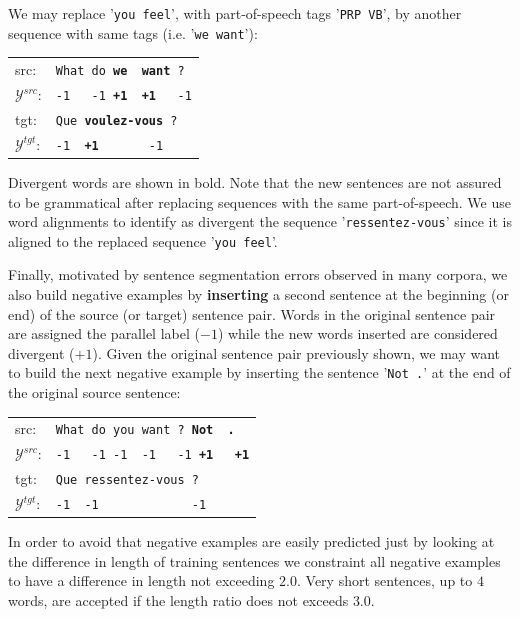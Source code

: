 \documentclass[11pt,a4paper]{article}
\begin{document}
We may replace '\texttt{you feel}', with part-of-speech tags '\texttt{PRP VB}', by another sequence with same tags (i.e. '\texttt{we want}'):

\begin{table}[h]
\begin{tabular}{ll}
src: & { \small \texttt{What do {\bf we \ want} ?}} \\
$\mathcal{Y}^{src}$: & { \small \texttt{-1 \ \  -1 {\bf +1\ \ +1} \ \  -1}} \\
tgt: & { \small \texttt{Que {\bf voulez-vous} ?}} \\
$\mathcal{Y}^{tgt}$: & { \small \texttt{-1\ \ {\bf +1}\ \ \ \ \ \ \ -1}} \\
\end{tabular}
\end{table}

Divergent words are shown in bold. 
Note that the new sentences are not assured to be grammatical after replacing sequences with the same part-of-speech.
We use word alignments to identify as divergent the sequence '\texttt{ressentez-vous}' since it is aligned to the replaced sequence '\texttt{you feel}'.

Finally, motivated by sentence segmentation errors observed in many corpora, we also build negative examples by {\bf inserting} a second sentence at the beginning (or end) of the source (or target) sentence pair. 
Words in the original sentence pair are assigned the parallel label ($-1$) while the new words inserted are considered divergent ($+1$).
Given the original sentence pair previously shown, we may want to build the next negative example by inserting the sentence '\texttt{Not .}' at the end of the original source sentence:

\begin{table}[h]
\begin{tabular}{ll}
src: & { \small \texttt{What do you want ? {\bf Not \ .}}} \\
$\mathcal{Y}^{src}$: & { \small \texttt{-1 \ \  -1 -1 \ -1  \ \ -1 {\bf +1\ \ \  +1}}} \\
tgt: & { \small \texttt{Que ressentez-vous ?}} \\
$\mathcal{Y}^{tgt}$: & { \small \texttt{-1\ \ -1\ \ \ \ \ \ \ \ \ \ \ \ \ -1}} \\
\end{tabular}
\end{table}

In order to avoid that negative examples are easily predicted just by looking at the difference in length of training sentences we constraint all negative examples to have a difference in length not exceeding $2.0$. Very short sentences, up to $4$ words, are accepted if the length ratio does not exceeds $3.0$.
\end{document}
